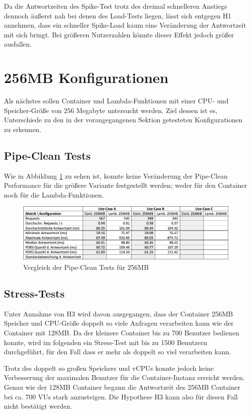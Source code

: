 Da die Antwortzeiten des Spike-Test trotz des dreimal schnelleren Anstiegs dennoch äußerst nah bei denen des Load-Tests liegen, lässt sich entgegen H1 annehmen, dass ein schneller Spike-Load kaum eine Veränderung der Antwortzeit mit sich bringt. Bei größeren Nutzerzahlen könnte dieser Effekt jedoch größer ausfallen.


\section{256MB Konfigurationen}
Als nächstes sollen Container und Lambda-Funktionen mit einer CPU- und Speicher-Größe von 256 Megabyte untersucht werden. Ziel dessen ist es, Unterschiede zu den in der vorangegangenen Sektion getesteten Konfigurationen zu erkennen.

\subsection{Pipe-Clean Tests}
Wie in Abbildung \ref{fig:pipe256-comparison} zu sehen ist, konnte keine Veränderung der Pipe-Clean Performance für die größere Variante festgestellt werden; weder für den Container noch für die Lambda-Funktionen.
\begin{figure}[H]
    \includegraphics[width=\textwidth]{img/pipe256-comparison.png}
    \caption[Vergleich der Pipe-Clean Tests für 256MB]{Vergleich der Pipe-Clean Tests für 256MB}
    \label{fig:pipe256-comparison}
\end{figure}

\subsection{Stress-Tests}
Unter Annahme von H3 wird davon ausgegangen, dass der Container 256MB Speicher und CPU-Größe doppelt so viele Anfragen verarbeiten kann wie der Container mit 128MB. Da der kleinere Container bis zu 700 Benutzer bedienen konnte, wird im folgenden ein Stress-Test mit bis zu 1500 Benutzern durchgeführt, für den Fall dass er mehr als doppelt so viel verarbeiten kann.

Trotz des doppelt so großen Speichers und vCPUs konnte jedoch keine Verbesserung der maximalen Benutzer für die Container-Instanz erreicht werden. Genau wie der 128MB Container begann die Antwortzeit des 256MB Container bei ca. 700 VUs stark anzusteigen. Die Hypothese H3 kann also für diesen Fall nicht bestätigt werden.

